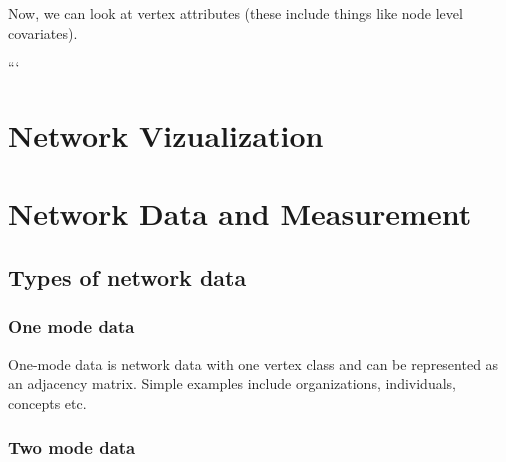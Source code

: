 \documentclass[]{book}
\newenvironment{Shaded}{\begin{snugshade}}{\end{snugshade}}
\newcommand{\KeywordTok}[1]{\textcolor[rgb]{0.13,0.29,0.53}{\textbf{{#1}}}}
\newcommand{\DecValTok}[1]{\textcolor[rgb]{0.00,0.00,0.81}{{#1}}}
\newcommand{\StringTok}[1]{\textcolor[rgb]{0.31,0.60,0.02}{{#1}}}
\newcommand{\CommentTok}[1]{\textcolor[rgb]{0.56,0.35,0.01}{\textit{{#1}}}}
\newcommand{\NormalTok}[1]{{#1}}
\theoremstyle{definition}
\theoremstyle{definition}
\theoremstyle{definition}
\theoremstyle{remark}
\begin{document}
Now, we can look at vertex attributes (these include things like node
level covariates).

\begin{Shaded}
\end{Shaded}

```

\chapter{Network Vizualization}\label{networkvizualization}

\chapter{Network Data and
Measurement}\label{network-data-and-measurement}

\section{Types of network data}\label{types-of-network-data}

\subsection{One mode data}\label{one-mode-data}

One-mode data is network data with one vertex class and can be
represented as an adjacency matrix. Simple examples include
organizations, individuals, concepts etc.

\subsection{Two mode data}\label{two-mode-data}
\end{document}
